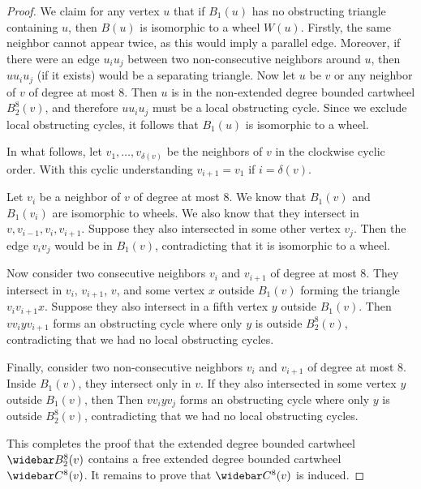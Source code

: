 \documentclass[10pt,a4paper]{article}
\renewcommand{\bar}{\widebar}
\begin{document}
\begin{proof}
   We claim for any vertex $u$ that if $B_1(u)$ has no obstructing triangle containing $u$, then $B(u)$ is isomorphic to a wheel $W(u)$. Firstly, the same neighbor cannot
   appear twice, as this would imply a parallel edge. Moreover,
   if there were an edge $u_iu_j$ between two non-consecutive neighbors around $u$, then $uu_iu_j$ (if it exists) would be a separating triangle. Now let $u$ be $v$ or any neighbor of $v$ of degree at most $8$. Then $u$ is in the non-extended degree bounded cartwheel $B_2^8(v)$, and therefore  $uu_iu_j$ must be a local
   obstructing cycle. Since we exclude
   local obstructing cycles, it follows that $B_1(u)$ is isomorphic to a wheel.

   In what follows, let $v_1,\ldots,v_{\delta(v)}$ be the
   neighbors of $v$ in the clockwise cyclic order.
   With this cyclic understanding
   $v_{i+1}=v_{1}$ if $i=\delta(v)$.

   Let $v_i$ be a neighbor of $v$ of degree at most $8$. We know
   that $B_1(v)$ and $B_1(v_i)$ are isomorphic to wheels. We also know that they intersect in $v,v_{i-1},v_i,v_{i+1}$. Suppose they also intersected in some other
   vertex $v_j$. Then the edge $v_iv_j$
   would be in $B_1(v)$, contradicting that it is isomorphic to a wheel.

  Now consider two consecutive neighbors $v_i$ and $v_{i+1}$ of
  degree at most 8.  They intersect in $v_i$, $v_{i+1}$, $v$, and some vertex $x$ outside $B_1(v)$ forming the triangle $v_iv_{i+1}x$.
  Suppose they also intersect in a fifth vertex $y$ outside $B_1(v)$.
  Then $vv_iyv_{i+1}$ forms an obstructing cycle where only $y$ is outside $B^8_2(v)$, contradicting that we had no local obstructing cycles.

  Finally, consider two non-consecutive neighbors $v_i$ and $v_{i+1}$ of
  degree at most 8.  Inside $B_1(v)$, they intersect only in $v$. If they also intersected in some vertex $y$ outside $B_1(v)$, then 
  Then $vv_iyv_j$ forms an obstructing cycle where only $y$ is outside $B^8_2(v)$, contradicting that we had no local obstructing cycles.

  This completes the proof that the extended degree bounded cartwheel 
  $\bar B_2^8(v)$ contains a free extended degree bounded cartwheel $\bar C^8(v)$.
  It remains to prove that $\bar C^8(v)$ is induced. 


\end{proof}
\end{document}
